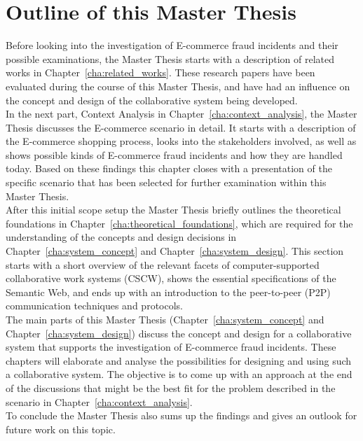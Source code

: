 
\section{Outline of this Master Thesis}
\label{sec:thesis_outline}

Before looking into the investigation of \gls{E-commerce} fraud incidents and their possible examinations, the Master Thesis starts with a description of related works in Chapter~\ref{cha:related_works}. These research papers have been evaluated during the course of this Master Thesis, and have had an influence on the concept and design of the collaborative system being developed. \\

In the next part, Context Analysis in Chapter~\ref{cha:context_analysis}, the Master Thesis discusses the \gls{E-commerce} scenario in detail. It starts with a description of the \gls{E-commerce} shopping process, looks into the stakeholders involved, as well as shows possible kinds of \gls{E-commerce} fraud incidents and how they are handled today. Based on these findings this chapter closes with a presentation of the specific scenario that has been selected for further examination within this Master Thesis. \\

After this initial scope setup the Master Thesis briefly outlines the theoretical foundations in Chapter~\ref{cha:theoretical_foundations}, which are required for the understanding of the concepts and design decisions in Chapter~\ref{cha:system_concept} and Chapter~\ref{cha:system_design}. This section starts with a short overview of the relevant facets of computer-supported collaborative work systems (\gls{CSCW}), shows the essential specifications of the Semantic Web, and ends up with an introduction to the peer-to-peer (\gls{P2P}) communication techniques and protocols. \\

The main parts of this Master Thesis (Chapter~\ref{cha:system_concept} and Chapter~\ref{cha:system_design}) discuss the concept and design for a collaborative system that supports the investigation of \gls{E-commerce} fraud incidents. These chapters will elaborate and analyse the possibilities for designing and using such a collaborative system. The objective is to come up with an approach at the end of the discussions that might be the best fit for the problem described in the scenario in Chapter~\ref{cha:context_analysis}. \\

To conclude the Master Thesis also sums up the findings and gives an outlook for future work on this topic.

